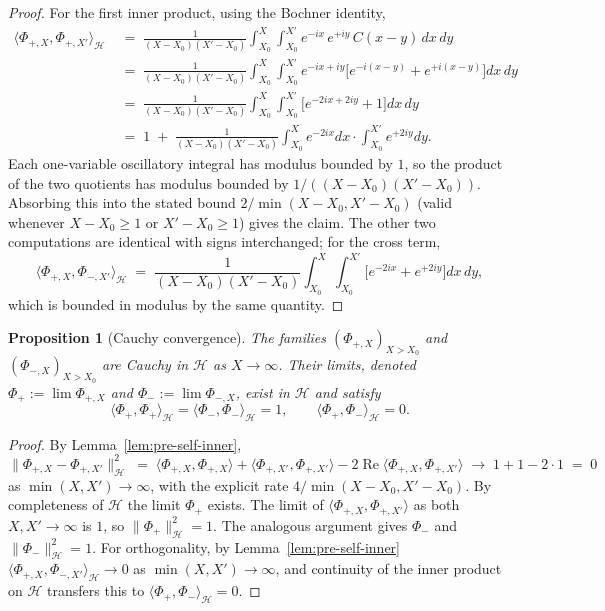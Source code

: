 \documentclass[11pt]{article}
\newtheorem{proposition}[theorem]{Proposition}
\theoremstyle{definition}
\theoremstyle{remark}
\DeclareMathOperator{\ReOp}{Re}
\let\Re\ReOp
\begin{document}
\begin{proof}
For the first inner product, using the Bochner identity,
\begin{align*}
  \langle\Phi_{+,X},\Phi_{+,X'}\rangle_{\mathcal{H}} &\;=\;\frac{1}{(X-X_0)(X'-X_0)}\int_{X_0}^X\int_{X_0}^{X'} e^{-ix}\,e^{+iy}\,C(x-y)\,dx\,dy\\
  &\;=\;\frac{1}{(X-X_0)(X'-X_0)}\int_{X_0}^X\int_{X_0}^{X'} e^{-ix+iy}\bigl[e^{-i(x-y)}+e^{+i(x-y)}\bigr]dx\,dy\\
  &\;=\;\frac{1}{(X-X_0)(X'-X_0)}\int_{X_0}^X\int_{X_0}^{X'}\bigl[e^{-2ix+2iy}+1\bigr]dx\,dy\\
  &\;=\;1\;+\;\frac{1}{(X-X_0)(X'-X_0)}\int_{X_0}^X e^{-2ix}dx\cdot\int_{X_0}^{X'}e^{+2iy}dy.
\end{align*}
Each one-variable oscillatory integral has modulus bounded by $1$, so the product of the two quotients has modulus bounded by $1/((X-X_0)(X'-X_0))$. Absorbing this into the stated bound $2/\min(X-X_0,X'-X_0)$ (valid whenever $X-X_0\ge 1$ or $X'-X_0\ge 1$) gives the claim. The other two computations are identical with signs interchanged; for the cross term,
\[
  \langle\Phi_{+,X},\Phi_{-,X'}\rangle_{\mathcal{H}}\;=\;\frac{1}{(X-X_0)(X'-X_0)}\int_{X_0}^X\int_{X_0}^{X'}\bigl[e^{-2ix}+e^{+2iy}\bigr]dx\,dy,
\]
which is bounded in modulus by the same quantity.
\end{proof}

\begin{proposition}[Cauchy convergence]\label{prop:cauchy}
The families $(\Phi_{+,X})_{X>X_0}$ and $(\Phi_{-,X})_{X>X_0}$ are Cauchy in $\mathcal{H}$ as $X\to\infty$. Their limits, denoted $\Phi_+:=\lim\Phi_{+,X}$ and $\Phi_-:=\lim\Phi_{-,X}$, exist in $\mathcal{H}$ and satisfy
\[
  \langle\Phi_+,\Phi_+\rangle_\mathcal{H}=\langle\Phi_-,\Phi_-\rangle_\mathcal{H}=1,\qquad \langle\Phi_+,\Phi_-\rangle_\mathcal{H}=0.
\]
\end{proposition}

\begin{proof}
By Lemma~\ref{lem:pre-self-inner},
\[
  \|\Phi_{+,X}-\Phi_{+,X'}\|_\mathcal{H}^2\;=\;\langle\Phi_{+,X},\Phi_{+,X}\rangle+\langle\Phi_{+,X'},\Phi_{+,X'}\rangle-2\Re\langle\Phi_{+,X},\Phi_{+,X'}\rangle\;\to\;1+1-2\cdot 1\;=\;0
\]
as $\min(X,X')\to\infty$, with the explicit rate $4/\min(X-X_0,X'-X_0)$. By completeness of $\mathcal{H}$ the limit $\Phi_+$ exists. The limit of $\langle\Phi_{+,X},\Phi_{+,X'}\rangle$ as both $X,X'\to\infty$ is $1$, so $\|\Phi_+\|_\mathcal{H}^2=1$. The analogous argument gives $\Phi_-$ and $\|\Phi_-\|_\mathcal{H}^2=1$. For orthogonality, by Lemma~\ref{lem:pre-self-inner} $\langle\Phi_{+,X},\Phi_{-,X'}\rangle_\mathcal{H}\to 0$ as $\min(X,X')\to\infty$, and continuity of the inner product on $\mathcal{H}$ transfers this to $\langle\Phi_+,\Phi_-\rangle_\mathcal{H}=0$.
\end{proof}
\end{document}
